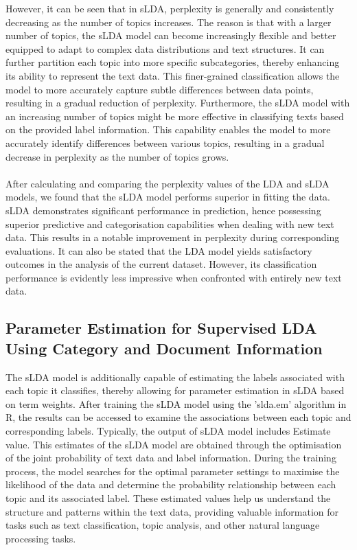 \documentclass[12pt,twoside]{article}
\begin{document}
However, it can be seen that in sLDA, perplexity is generally and consistently decreasing as the number of topics increases. The reason is that with a larger number of topics, the sLDA model can become increasingly flexible and better equipped to adapt to complex data distributions and text structures. It can further partition each topic into more specific subcategories, thereby enhancing its ability to represent the text data. This finer-grained classification allows the model to more accurately capture subtle differences between data points, resulting in a gradual reduction of perplexity. Furthermore, the sLDA model with an increasing number of topics might be more effective in classifying texts based on the provided label information. This capability enables the model to more accurately identify differences between various topics, resulting in a gradual decrease in perplexity as the number of topics grows.\\\\

After calculating and comparing the perplexity values of the LDA and sLDA models, we found that the sLDA model performs superior in fitting the data. sLDA demonstrates significant performance in prediction, hence possessing superior predictive and categorisation capabilities when dealing with new text data. This results in a notable improvement in perplexity during corresponding evaluations. It can also be stated that the LDA model yields satisfactory outcomes in the analysis of the current dataset. However, its classification performance is evidently less impressive when confronted with entirely new text data.

\subsection{Parameter Estimation for Supervised LDA Using Category and Document Information}
The sLDA model is additionally capable of estimating the labels associated with each topic it classifies, thereby allowing for parameter estimation in sLDA based on term weights. After training the sLDA model using the 'slda.em' algorithm in R, the results can be accessed to examine the associations between each topic and corresponding labels. Typically,
the output of sLDA model includes Estimate value. This estimates of the sLDA model are obtained through the optimisation of the joint probability of text data and label information. During the training process, the model searches for the optimal parameter settings to maximise the likelihood of the data and determine the probability relationship between each topic and its associated label. These estimated values help us understand the structure and patterns within the text data, providing valuable information for tasks such as text classification, topic analysis, and other natural language processing tasks.\\\\
\end{document}
